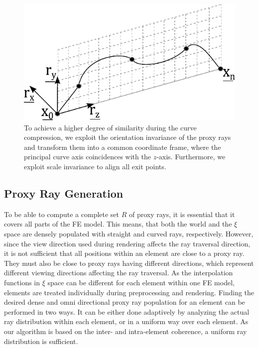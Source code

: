 \documentclass[journal]{vgtc}                %
\begin{document}
\begin{figure}[b]
	\centering
	\includegraphics[width=0.75\linewidth]{figures/splinetransformation}
	\caption{To achieve a higher degree of similarity during the curve compression, we exploit the orientation invariance of the proxy rays and transform them into a common coordinate frame, where the principal curve axis coincidences with the $z$-axis. Furthermore, we exploit scale invariance to align all exit points.}
	\label{fig:proxyrayalignment}
\end{figure}


\subsection{Proxy Ray Generation}\label{subsec:proxyraygeneration}

To be able to compute a complete set $R$ of proxy rays, it is essential that it covers all parts of the FE model. This means, that both the world and the $\xi$ space are densely populated with straight and curved rays, respectively. However, since the view direction used during rendering affects the ray traversal direction, it is not sufficient that all positions within an element are close to a proxy ray. They must also be close to proxy rays having different directions, which represent different viewing directions affecting the ray traversal. As the interpolation functions in $\xi$ space can be different for each element within one FE model, elements are treated individually during preprocessing and rendering. Finding the desired dense and omni directional proxy ray population for an element can be performed in two ways. It can be either done adaptively by analyzing the actual ray distribution within each element, or in a uniform way over each element. As our algorithm is based on the inter- and intra-element coherence, a uniform ray distribution is sufficient.
\end{document}
